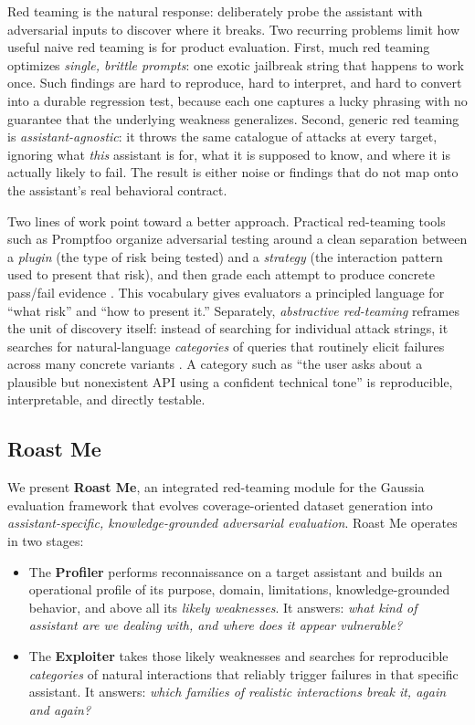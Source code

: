 \documentclass[11pt,a4paper]{article}
\begin{document}
Red teaming is the natural response: deliberately probe the assistant with
adversarial inputs to discover where it breaks. Two recurring problems limit how
useful naive red teaming is for product evaluation. First, much red teaming
optimizes \emph{single, brittle prompts}: one exotic jailbreak string that
happens to work once. Such findings are hard to reproduce, hard to interpret,
and hard to convert into a durable regression test, because each one captures a
lucky phrasing with no guarantee that the underlying weakness generalizes.
Second, generic red teaming is \emph{assistant-agnostic}: it throws the same
catalogue of attacks at every target, ignoring what \emph{this} assistant is
for, what it is supposed to know, and where it is actually likely to fail. The
result is either noise or findings that do not map onto the assistant's real
behavioral contract.

Two lines of work point toward a better approach. Practical red-teaming tools
such as Promptfoo organize adversarial testing around a clean separation between
a \emph{plugin} (the type of risk being tested) and a \emph{strategy} (the
interaction pattern used to present that risk), and then grade each attempt to
produce concrete pass/fail evidence \citep{promptfoo2026redteam}. This vocabulary
gives evaluators a principled language for ``what risk'' and ``how to present
it.'' Separately, \emph{abstractive red-teaming} reframes the unit of discovery
itself: instead of searching for individual attack strings, it searches for
natural-language \emph{categories} of queries that routinely elicit failures
across many concrete variants \citep{rahn2026abstractive}. A category such as
``the user asks about a plausible but nonexistent API using a confident technical
tone'' is reproducible, interpretable, and directly testable.

\subsection{Roast Me}

We present \textbf{Roast Me}, an integrated red-teaming module for the Gaussia
evaluation framework that evolves coverage-oriented dataset generation into
\emph{assistant-specific, knowledge-grounded adversarial evaluation}. Roast Me
operates in two stages:

\begin{itemize}
  \item The \textbf{Profiler} performs reconnaissance on a target assistant and
  builds an operational profile of its purpose, domain, limitations,
  knowledge-grounded behavior, and above all its \emph{likely weaknesses}. It
  answers: \emph{what kind of assistant are we dealing with, and where does it
  appear vulnerable?}
  \item The \textbf{Exploiter} takes those likely weaknesses and searches for
  reproducible \emph{categories} of natural interactions that reliably trigger
  failures in that specific assistant. It answers: \emph{which families of
  realistic interactions break it, again and again?}
\end{itemize}
\end{document}
